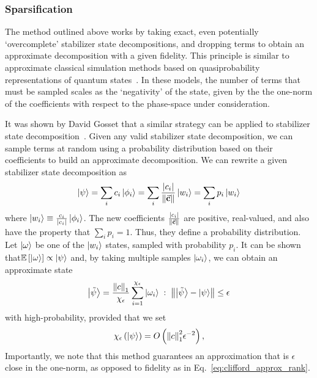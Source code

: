 \subsubsection{Sparsification}
The method outlined above works by taking exact, even potentially `overcomplete' stabilizer state decompositions, and dropping terms to obtain an approximate decomposition with a given fidelity. This principle is similar to approximate classical simulation methods based on quasiprobability representations of quantum states~\cite{Pashayan2015}. In these models, the number of terms that must be sampled scales as the `negativity' of the state, given by the the one-norm of the coefficients with respect to the phase-space under consideration.\par
It was shown by David Gosset that a similar strategy can be applied to stabilizer state decomposition~\cite{Bravyi2018}. Given any valid stabilizer state decomposition, we can sample terms at random using a probability distribution based on their coefficients to build an approximate decomposition. We can rewrite a given stabilizer state decomposition as
\begin{equation}
\ket{\psi}=\sum_{i}c_{i}\ket{\phi_{i}} = \sum_{i}\frac{\left|c_{i}\right|}{\norm{\va{c}}}\ket{w_{i}} = \sum_{i}p_{i}\ket{w_{i}}
\end{equation}
where $\ket{w_{i}}\equiv \frac{c_{i}}{\left|c_{i}\right|}\ket{\phi_{i}}$. The new coefficients $\frac{\left|c_{i}\right|}{\norm{\va{c}}}$ are positive, real-valued, and also have the property that $\sum_{i}p_{i}=1$. Thus, they define a probability distribution. Let $\ket{\omega}$ be one of the $\ket{w_{i}}$ states, sampled with probability $p_{i}$. It can be shown that$\mathbb{E}\left[\ket{\omega}\right]\propto \ket{\psi}$ and, by taking multiple samples $\ket{\omega_{i}}$, we can obtain an approximate state
\begin{equation}
\ket{\tilde{\psi}} = \frac{\norm{c}_{1}}{\chi_{\epsilon}}\sum_{i=1}^{\chi_{\epsilon}}\ket{\omega_{i}}\;:\;\norm{\ket{\tilde{\psi}}-\ket{\psi}} \leq \epsilon 
\end{equation}
with high-probability, provided that we set~\cite{Bravyi2018}
\begin{equation}
\chi_{\epsilon}\left(\ket{\psi}\right) = O\left(\norm{c}_{1}^{2}\epsilon^{-2}\right),
\end{equation}
Importantly, we note that this method guarantees an approximation that is $\epsilon$ close in the one-norm, as opposed to fidelity as in Eq.~\ref{eq:clifford_approx_rank}.\par
